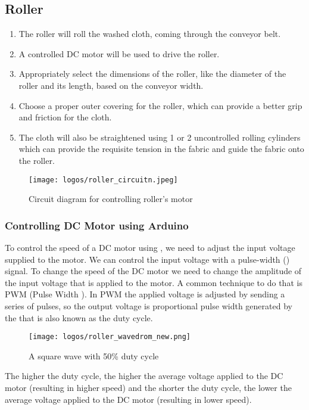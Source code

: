 \documentclass[table,french,english]{rapportCS}
\begin{document}
\subsection{Roller}\label{sec:roller}
\begin{enumerate}
  \item The roller will roll the washed cloth, coming through the conveyor belt.
  \item A controlled DC motor will be used to drive the roller.
  \item Appropriately select the dimensions of the roller, like the diameter of the roller and its length, based on the conveyor width.
  \item Choose a proper outer covering for the roller, which can provide a better grip and friction for the cloth.
  \item The cloth will also be straightened using 1 or 2 uncontrolled rolling cylinders which can provide the requisite tension in the fabric and guide the fabric onto the roller.
\end{enumerate}
\begin{figure}[h]
    \centering
    \texttt{[image: logos/roller\_circuitn.jpeg]}
    \caption{Circuit diagram for controlling roller's motor }                   
    \label{fig:outlinemindmap}
\end{figure}
\newpage

\subsubsection{Controlling DC Motor using Arduino}\label{sec:contdcmotor}

To control the speed of a DC motor using , we need to adjust the input voltage supplied to the motor. 
We can control the input voltage with a pulse-width  () signal.
To change the speed of the DC motor we need to change the amplitude of the input voltage that is applied to the motor.
A common technique to do that is PWM (Pulse Width ). In PWM the applied voltage is adjusted by sending a series of pulses, so the output voltage is proportional pulse width generated by the   that is also known as the duty cycle.
\begin{figure}[h]
    \centering
    \texttt{[image: logos/roller\_wavedrom\_new.png]}
    \caption{A square wave with 50\% duty cycle}
    \label{fig:outlinemindmap}
\end{figure}
The higher the duty cycle, the higher the average voltage applied to the DC motor (resulting in higher speed) and the shorter the duty cycle, the lower the average voltage applied to the DC motor (resulting in lower speed).
\end{document}

